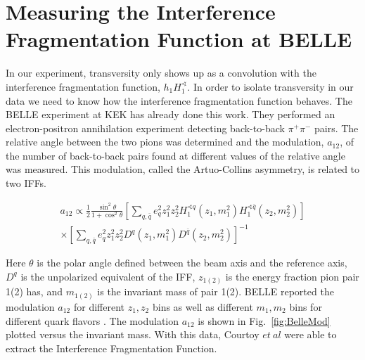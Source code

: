 \documentclass[letterpaper, abstract = on,listof=totoc, bibliography=totoc]{scrreprt}
\begin{document}
\section{Measuring the Interference Fragmentation Function at BELLE}

In our experiment, transversity only shows up as a convolution with the interference fragmentation function, $h_1H_1^\sphericalangle$. In order to isolate transversity in our data we need to know how the interference fragmentation function behaves. The BELLE experiment at KEK has already done this work\cite{belleIFF}. They performed an electron-positron annihilation experiment detecting back-to-back $\pi^+\pi^-$ pairs. The relative angle between the two pions was determined and the modulation, $a_{12}$, of the number of back-to-back pairs found at different values of the relative angle was measured. This modulation, called the Artuo-Collins asymmetry, is related to two IFFs. 
     
\begin{multline}
a_{12} \propto \frac{1}{2} \frac{\sin^2\theta}{1+\cos^2\theta} \left[ \sum_{q,\bar{q}}e_q^2z_1^2z_2^2H_1^{\sphericalangle q}(z_1, m_1^2)H_1^{\sphericalangle \bar{q}}(z_2, m_2^2)\right] \\ \times \left[ \sum_{q,\bar{q}}e_q^2z_1^2z_2^2D^{q}(z_1, m_1^2)D^{\bar{q}}(z_2, m_2^2)\right]^{-1}
\label{eq:A-Casym}
\end{multline}

Here $\theta$ is the polar angle defined between the beam axis and the reference axis, $D^q$ is the unpolarized equivalent of the IFF, $z_{1(2)}$ is the energy fraction pion pair 1(2) has, and $m_{1(2)}$ is the invariant mass of pair 1(2). BELLE reported the modulation $a_{12}$ for different $z_1,z_2$ bins as well as different $m_1,m_2$ bins for different quark flavors \cite{belleIFF}. The modulation $a_{12}$ is shown in Fig.~\ref{fig:BelleMod} plotted versus the invariant mass. With this data, Courtoy $et~al$ \cite{extractIFF} were able to extract the Interference Fragmentation Function.
\end{document}
